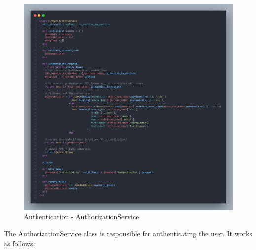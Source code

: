 \begin{justify}
        \begin{figure}[H]
            \centerline{\includegraphics[width=150mm,scale=1]{figures/implementation_and_testing/implementation/backend/AuthorizationService.png}}
            \caption{Authentication - AuthorizationService}
        \end{figure}

        \newendline The AuthorizationService class is responsible for authenticating the user. It works as follows:


\end{justify}
